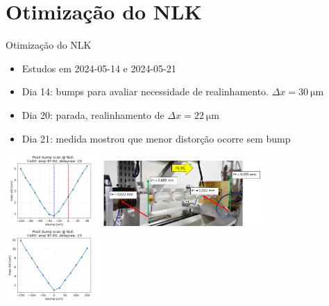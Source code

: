 \section{Otimização do NLK}



\begin{frame}{Otimização do NLK}

\begin{itemize}
    \item Estudos em 2024-05-14 e 2024-05-21
    \item Dia 14: bumps para avaliar necessidade de realinhamento. $\Delta x = \SI{30}{\micro\meter}$
    \item Dia 20: parada, realinhamento de $\Delta x = \SI{22}{\micro\meter}$
    \item Dia 21: medida mostrou que menor distorção ocorre sem bump 
\end{itemize}
\vspace{1cm}
    \centering
    \includegraphics[width=0.27\textwidth]{2024-07-12/figures/NLK_scanbumpx_before_align.png}\hfill
    \includegraphics[width=0.45\textwidth]{2024-07-12/figures/NLK_align_May2024.png}\hfill
    \includegraphics[width=0.27\textwidth]{2024-07-12/figures/NLK_scanbumpx_after_align.png}
\end{frame}
